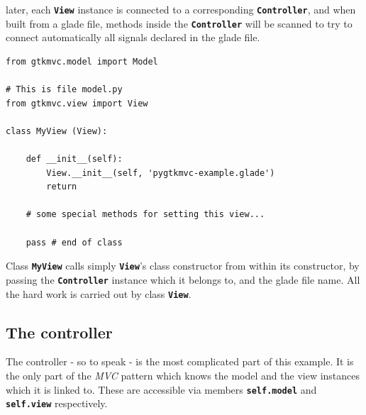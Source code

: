 \documentclass{article}
\newcommand{\kw}[1]{\emph{#1}\xspace}
\newcommand{\mvc}{\kw{MVC} pattern\xspace}
\newcommand{\codename}[1]{\texttt{\bfseries \textcolor {codecolor}{#1}}\xspace}
\newcommand{\codesize}{\small } %
\begin{document}
later, each \codename{View} instance is connected to a
corresponding \codename{Controller}, and when built from a glade file,
methods inside the \codename{Controller} will be scanned to try to
connect automatically all signals declared in the glade file.

{ \codesize 
\begin{verbatim}   
from gtkmvc.model import Model
  
# This is file model.py
from gtkmvc.view import View

class MyView (View):

    def __init__(self):
        View.__init__(self, 'pygtkmvc-example.glade')
        return

    # some special methods for setting this view...

    pass # end of class
\end{verbatim}
}

Class \codename{MyView} calls simply \codename{View}'s class
constructor from within its constructor, by passing the
\codename{Controller} instance which it belongs to, and the glade file
name. All the hard work is carried out by class \codename{View}.


\subsection{The controller}
The controller - so to speak - is the most complicated part of this
example. It is the only part of the \mvc which knows the model and the
view instances which it is linked to. These are accessible via members
\codename{self.model} and \codename{self.view} respectively.
  
\end{document}
